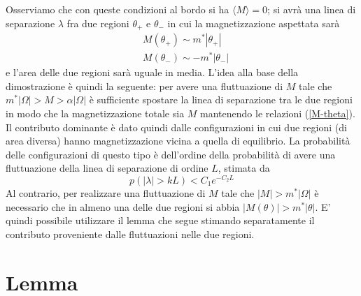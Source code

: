 \documentclass[aps,pre]{revtex4}
\newcommand{\beq}{\begin{equation}}
\newcommand{\eeq}{\end{equation}}
\begin{document}
\noindent
Osserviamo che con queste condizioni al bordo si ha $\langle M \rangle = 0$; si avr\`a una linea di separazione $\lambda$ fra due regioni $\theta_+$ e $\theta_-$ in cui la magnetizzazione aspettata sar\`a
\beq
\label{M-theta}
\begin{split}
&M(\theta_+) \sim m^* |\theta_+| \\
&M(\theta_-) \sim -m^* |\theta_-|
\end{split}
\eeq
e l'area delle due regioni sar\`a uguale in media.
L'idea alla base della dimostrazione \`e quindi la seguente: per avere una fluttuazione di $M$ tale che $m^* |\Omega| > M > \alpha |\Omega|$ \`e sufficiente spostare la linea di separazione tra le due regioni in modo che la magnetizzazione totale sia $M$ mantenendo le relazioni (\ref{M-theta}). Il contributo dominante \`e dato quindi dalle configurazioni in cui due regioni (di area diversa) hanno magnetizzazione vicina a quella di equilibrio. La probabilit\`a delle configurazioni di questo tipo \`e dell'ordine della probabilit\`a di avere una fluttuazione della linea di separazione di ordine $L$, stimata da
\beq
p(|\lambda| > k L) < C_1 e^{-C_2 L}
\eeq
Al contrario, per realizzare una fluttuazione di $M$ tale che $|M| > m^* |\Omega|$ \`e necessario che in almeno una delle due regioni si abbia $|M(\theta)| > m^* |\theta|$. E' quindi possibile utilizzare il lemma che segue stimando separatamente il contributo proveniente dalle fluttuazioni nelle due regioni.

\section{Lemma}
\end{document}
